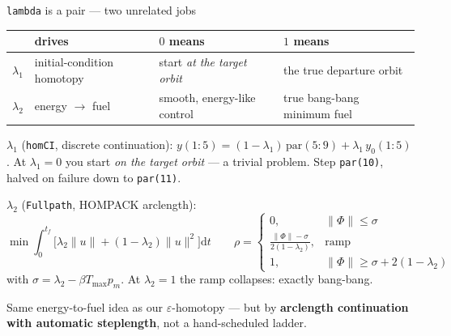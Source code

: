 \documentclass[10pt,aspectratio=169]{beamer}
\newcommand{\code}[1]{\texttt{\small #1}}
\newcommand{\Tmax}{T_{\max}}
\begin{document}
\begin{frame}{\code{lambda} is a pair --- two unrelated jobs}

\begin{center}\small
\begin{tabular}{@{}llll@{}}
\toprule
 & drives & $0$ means & $1$ means\\
\midrule
$\lambda_1$ & initial-condition homotopy & start \emph{at the target orbit} &
the true departure orbit\\
$\lambda_2$ & energy $\to$ fuel & smooth, energy-like control &
true bang-bang minimum fuel\\
\bottomrule
\end{tabular}
\end{center}

\vspace{2pt}
\textbf{$\lambda_1$} (\code{homCI}, discrete continuation):
$y(1{:}5) = (1-\lambda_1)\,\mathrm{par}(5{:}9) + \lambda_1\,y_0(1{:}5)$.
At $\lambda_1 = 0$ you start \emph{on the target orbit} --- a trivial problem.
Step \code{par(10)}, halved on failure down to \code{par(11)}.

\textbf{$\lambda_2$} (\code{Fullpath}, HOMPACK arclength):
\begin{equation*}
\min \int_0^{t_f}\Big[\lambda_2\|u\| + (1-\lambda_2)\|u\|^2\Big]\mathrm{d}t
\qquad
\rho =
\begin{cases}
0, & \|\Phi\| \le \sigma\\
\frac{\|\Phi\|-\sigma}{2(1-\lambda_2)}, & \text{ramp}\\
1, & \|\Phi\| \ge \sigma + 2(1-\lambda_2)
\end{cases}
\end{equation*}
with $\sigma = \lambda_2 - \beta\Tmax p_m$. At $\lambda_2 = 1$ the ramp
collapses: exactly bang-bang.

\begin{block}{}
Same energy-to-fuel idea as our $\varepsilon$-homotopy --- but by
\textbf{arclength continuation with automatic steplength}, not a
hand-scheduled ladder.
\end{block}
\end{frame}
\end{document}
